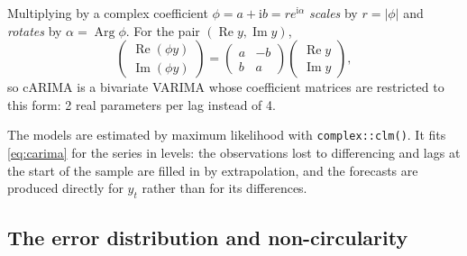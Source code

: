 \documentclass[11pt,a4paper]{article}
\newcommand{\iu}{\mathrm{i}}
\newcommand{\code}[1]{\texttt{#1}}
\DeclareMathOperator{\Arg}{Arg}
\newcommand{\1}{\mathbf{1}}
\renewcommand{\Re}{\operatorname{Re}}
\renewcommand{\Im}{\operatorname{Im}}
\begin{document}
Multiplying by a complex coefficient $\phi = a + \iu b = r e^{\iu\alpha}$ \emph{scales} by
$r = |\phi|$ and \emph{rotates} by $\alpha = \Arg\phi$. For the pair $(\Re y, \Im y)$,
\begin{equation}
  \begin{pmatrix} \Re(\phi y) \\ \Im(\phi y) \end{pmatrix}
  = \begin{pmatrix} a & -b \\ b & a \end{pmatrix}
    \begin{pmatrix} \Re y \\ \Im y \end{pmatrix},
\end{equation}
so cARIMA is a bivariate VARIMA whose coefficient matrices are restricted to this form: 2 real
parameters per lag instead of 4.

The models are estimated by maximum likelihood with \code{complex::clm()}. It fits
\eqref{eq:carima} for the series in levels: the observations lost to differencing and lags at the
start of the sample are filled in by extrapolation, and the forecasts are produced directly for
$y_t$ rather than for its differences.

\subsection{The error distribution and non-circularity}\label{sec:error}
\end{document}
